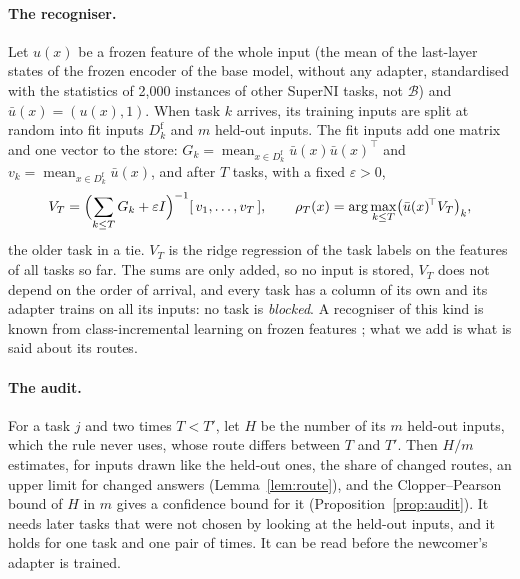 \paragraph{The recogniser.} Let $u(x)$ be a frozen feature of the whole input (the mean of the
last-layer states of the frozen encoder of the base model, without any adapter, standardised with
the statistics of 2{,}000 instances of other SuperNI tasks, not $\mathcal{B}$) and $\bar u(x) = (u(x), 1)$. When task $k$ arrives, its training
inputs are split at random into fit inputs $D_k^{\mathrm{f}}$ and $m$ held-out inputs. The fit inputs
add one matrix and one vector to the store:
$G_k = \operatorname{mean}_{x \in D_k^{\mathrm{f}}} \bar u(x)\bar u(x)^{\!\top}$ and
$v_k = \operatorname{mean}_{x \in D_k^{\mathrm{f}}} \bar u(x)$, and after $T$ tasks, with a fixed $\varepsilon > 0$,
\begin{equation}
  V_T = \Bigl(\sum_{k \le T} G_k + \varepsilon I\Bigr)^{-1} [\,v_1, \dots, v_T\,], \qquad
  \rho_T(x) = \arg\max_{k \le T} \bigl(\bar u(x)^{\!\top} V_T\bigr)_k ,
  \label{eq:recogniserShort}
\end{equation}
the older task in a tie. $V_T$ is the ridge regression of the task labels on the features of all
tasks so far. The sums are only added, so no input is stored, $V_T$ does not depend on the order of
arrival, and every task has a column of its own and its adapter trains on all its inputs: no task
is \emph{blocked}. A recogniser of this kind is known from
class-incremental learning on frozen features \citep{mcdonnell2023ranpac,zhuang2022acil}; what we add is
what is said about its routes.

\paragraph{The audit.} For a task $j$ and two times $T < T'$, let $H$ be the number of its $m$
held-out inputs, which the rule never uses, whose route differs between $T$ and $T'$. Then $H/m$
estimates, for inputs drawn like the held-out ones, the share of changed routes, an upper limit for
changed answers (Lemma~\ref{lem:route}), and the Clopper--Pearson bound of $H$ in $m$ gives a
confidence bound for it (Proposition~\ref{prop:audit}). It needs later tasks that were not chosen by
looking at the held-out inputs, and it holds for one task and one pair of times. It can be read
before the newcomer's adapter is trained.

